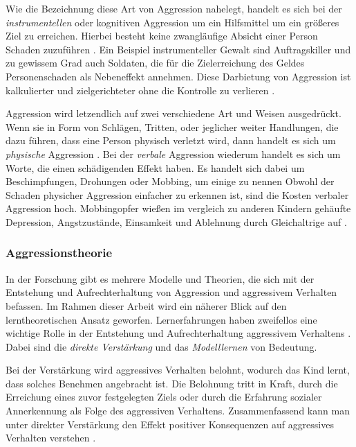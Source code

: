 Wie die Bezeichnung diese Art von Aggression nahelegt, handelt es sich bei der 
\textit{instrumentellen} oder kognitiven Aggression um ein Hilfsmittel um ein größeres Ziel zu 
erreichen. Hierbei besteht keine zwangläufige Absicht einer Person Schaden zuzuführen \parencite{instrumental_aggro, instrumental_dictionary}.
Ein Beispiel instrumenteller Gewalt sind Auftragskiller und zu gewissem Grad auch Soldaten, die
für die Zielerreichung des Geldes Personenschaden als Nebeneffekt annehmen. Diese Darbietung
von Aggression ist kalkulierter und zielgerichteter ohne die Kontrolle zu verlieren \parencite{impulsive_instrumental_aggro_healtline}.

Aggression wird letzendlich auf zwei verschiedene Art und Weisen ausgedrückt. Wenn sie in Form
von Schlägen, Tritten, oder jeglicher weiter Handlungen, die dazu führen, dass eine Person 
physisch verletzt wird, dann handelt es sich um \textit{physische} Aggression \parencite{impulsive_instrumental_aggro_healtline, physische_verbale_aggro, physische_verbale_aggro_2}.
Bei der \textit{verbale} Aggression wiederum handelt es sich um Worte, die einen schädigenden 
Effekt haben. Es handelt sich dabei um Beschimpfungen, Drohungen oder Mobbing, um einige zu 
nennen \parencite{physische_verbale_aggro, physische_verbale_aggro_2, impulsive_instrumental_aggro_healtline}
Obwohl der Schaden physicher Aggression einfacher zu erkennen ist, sind die Kosten verbaler 
Aggression hoch. Mobbingopfer wießen im vergleich zu anderen Kindern gehäufte Depression, 
Angstzustände, Einsamkeit und Ablehnung durch Gleichaltrige auf \parencite{ausmaß_verbale_aggro}.



\subsubsection{Aggressionstheorie}    \label{subsubsec_2.1.3.2}
In der Forschung gibt es mehrere Modelle und Theorien, die sich  mit der Entstehung und 
Aufrechterhaltung von Aggression und aggressivem Verhalten befassen. Im Rahmen dieser Arbeit wird
ein näherer Blick auf den lerntheoretischen Ansatz geworfen. Lernerfahrungen haben zweifellos eine
wichtige Rolle in der Entstehung und Aufrechterhaltung aggressivem Verhaltens \parencite{Aggro_Theorie}.
Dabei sind die \textit{direkte Verstärkung} und das \textit{Modelllernen} von Bedeutung. 

Bei der Verstärkung wird aggressives Verhalten belohnt, wodurch das Kind lernt, dass solches 
Benehmen angebracht ist. Die Belohnung tritt in Kraft, durch die Erreichung eines zuvor festgelegten
Ziels oder durch die Erfahrung sozialer Annerkennung als Folge des aggressiven Verhaltens. 
Zusammenfassend kann man unter direkter Verstärkung den Effekt positiver Konsequenzen auf aggressives 
Verhalten verstehen \parencite{Aggro_Theorie_Buch}.

